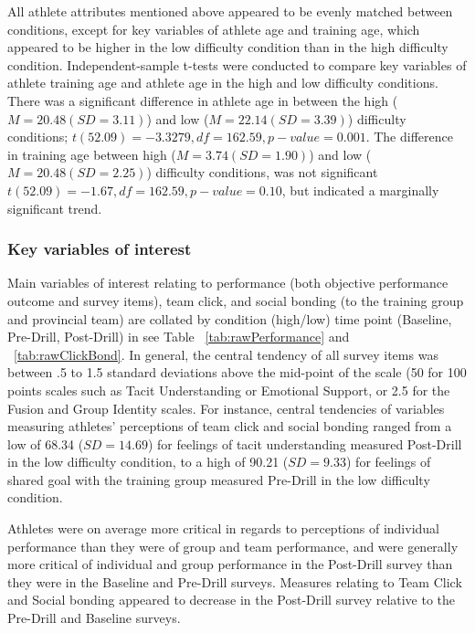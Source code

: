 All athlete attributes mentioned above appeared to be evenly matched between conditions, except for key variables of athlete age and training age, which appeared to be higher in the low difficulty condition than in the high difficulty condition. Independent-sample t-tests were conducted to compare key variables of athlete training age and athlete age in the high and low difficulty conditions. There was a significant difference in athlete age in between the high ($M= 20.48(SD =3.11)$) and low ($M= 22.14(SD =3.39)$) difficulty conditions; $t(52.09) = -3.3279, df = 162.59, p-value = 0.001$.  The difference in training age between high ($M= 3.74 (SD =1.90)$) and low ($M= 20.48(SD =2.25)$) difficulty conditions, was not significant $t(52.09)= -1.67, df = 162.59, p-value = 0.10$, but indicated a marginally significant trend.




\subsubsection{Key variables of interest \label{sec:surveyResponses}}

Main variables of interest relating to performance (both objective performance outcome and survey items), team click, and social bonding (to the training group and provincial team) are collated by condition (high/low) time point (Baseline, Pre-Drill, Post-Drill) in see Table ~\ref{tab:rawPerformance} and ~\ref{tab:rawClickBond}. In general, the central tendency of all survey items was between .5 to 1.5 standard deviations above the mid-point of the scale (50 for 100 points scales such as Tacit Understanding or Emotional Support, or 2.5 for the Fusion and Group Identity scales.   For instance, central tendencies of variables measuring athletes' perceptions of team click and social bonding ranged from a low of 68.34 ($SD = 14.69$) for feelings of tacit understanding measured Post-Drill in the low difficulty condition, to a high of 90.21 ($SD = 9.33$) for feelings of shared goal with the training group measured Pre-Drill in the low difficulty condition.

Athletes were on average more critical in regards to perceptions of individual performance than they were of group and team performance, and were generally more critical of individual and group performance in the Post-Drill survey than they were in the Baseline and Pre-Drill surveys.  Measures relating to Team Click and Social bonding appeared to decrease in the Post-Drill survey relative to the Pre-Drill and Baseline surveys.

